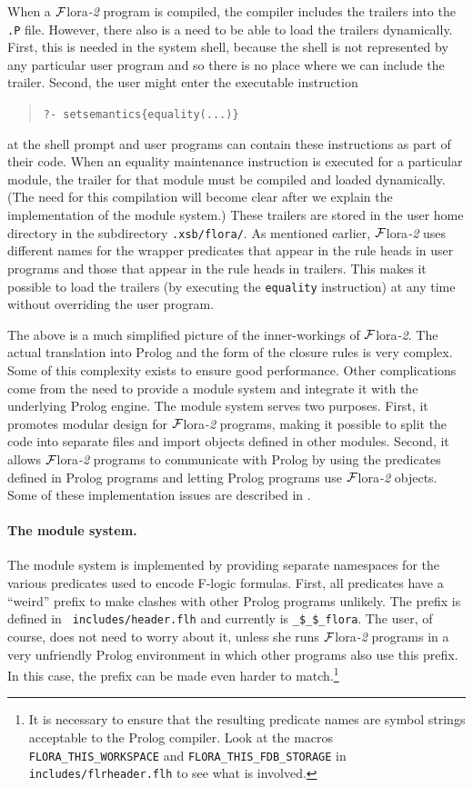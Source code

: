 \documentclass[11pt]{article}
\newcommand{\FLORA}{{\mbox{\sc ${\cal F}${lora}\rm\emph{-2}}}\xspace}
\newcommand{\fl}{\mbox{F-logic}\xspace}
\begin{document}
When a \FLORA program is compiled, the compiler includes the trailers into
the {\tt .P} file. However, there also is a need to be able to load the
trailers dynamically. First, this is needed in the system shell, because
the shell is not represented by any particular user program and so there is
no place where we can include the trailer. Second, the user might enter the
executable instruction 
\begin{quote}
   {\tt ?- setsemantics\{equality(...)\} }
\end{quote}
at the shell prompt and user programs can contain these instructions as
part of their code.  When an equality maintenance instruction is executed
for a particular module, the trailer for that module must be compiled and
loaded dynamically.  (The need for this compilation will become clear after
we explain the implementation of the module system.)  These trailers are
stored in the user home directory in the subdirectory {\tt .xsb/flora/}.
As mentioned earlier, \FLORA uses different names for the wrapper predicates
that appear in the rule heads in user programs and those that appear in the
rule heads in trailers. This makes it possible to load the trailers (by
executing the {\tt equality} instruction) at any time without overriding
the user program.

The above is a much simplified picture of the inner-workings of \FLORA. The
actual translation into Prolog and the form of the closure rules is very
complex.  Some of this complexity exists to ensure good performance.  Other
complications come from the need to provide a module system and integrate
it with the underlying Prolog engine.  The module system serves two
purposes.  First, it promotes modular design for \FLORA programs, making it
possible to split the code into separate files and import objects defined
in other modules. Second, it allows \FLORA programs to communicate with
Prolog by using the predicates defined in Prolog programs and letting
Prolog programs use \FLORA objects.  Some of these implementation issues
are described in \cite{guiz-flora-00}.

\paragraph{The module system.} The module system is implemented by
providing separate namespaces for the various predicates used to encode \fl
formulas. First, all predicates have a ``weird'' prefix to make clashes with
other Prolog programs unlikely. The prefix is defined in {\tt
  includes/header.flh} and currently is {\tt \_\$\_\$\_flora}. The user, of
course, does not need to worry about it, unless she runs \FLORA programs in
a very unfriendly Prolog environment in which other programs also use this
prefix. In this case, the prefix can be made
even harder to match.\footnote{
  It is necessary to ensure that the resulting predicate names are symbol
  strings acceptable to the Prolog compiler. Look at the macros
  {\tt FLORA\_THIS\_WORKSPACE} and {\tt FLORA\_THIS\_FDB\_STORAGE} in
  {\tt includes/flrheader.flh} to see what is involved.
  }
\end{document}
